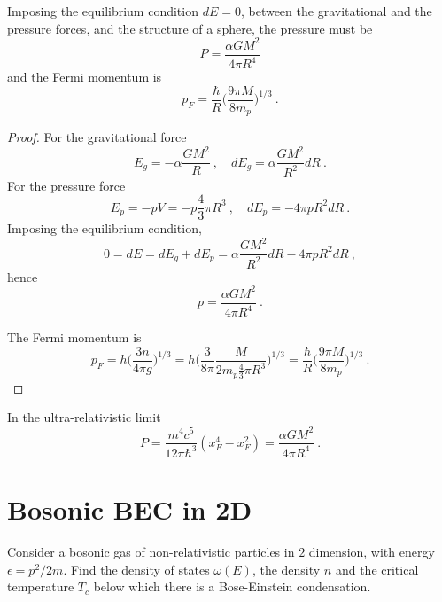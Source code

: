     Imposing the equilibrium condition $dE = 0$, between the gravitational and the pressure forces, and the structure of a sphere, the pressure must be 
    \begin{equation*}
        P = \frac{\alpha G M^2}{4 \pi R^4}
    \end{equation*}
    and the Fermi momentum is 
    \begin{equation*}
        p_F = \frac{\hbar}{R} \Big ( \frac{9 \pi M}{8 m_p} \Big)^{1/3} ~.
    \end{equation*}
    \begin{proof}
        For the gravitational force 
        \begin{equation*}
            E_g = - \alpha \frac{G M^2}{R} ~, \quad dE_g = \alpha \frac{GM^2}{R^2} dR ~.
        \end{equation*}
        For the pressure force 
        \begin{equation*}
            E_p = - p V = - p \frac{4}{3} \pi R^3 ~, \quad dE_p = - 4 \pi p R^2 dR ~.
        \end{equation*}
        Imposing the equilibrium condition, 
        \begin{equation*}
            0 = dE = dE_g + dE_p = \alpha \frac{GM^2}{R^2} dR - 4 \pi p R^2 dR ~,
        \end{equation*}
        hence 
        \begin{equation*}
            p = \frac{\alpha G M^2}{4 \pi R^4} ~.
        \end{equation*}

        The Fermi momentum is 
        \begin{equation*}
            p_F = h \Big ( \frac{3 n}{4 \pi g} \Big)^{1/3} = h \Big ( \frac{3}{8 \pi} \frac{M}{2 m_p \frac{4}{3} \pi R^3} \Big)^{1/3} = \frac{\hbar}{R} \Big ( \frac{9 \pi M}{8 m_p} \Big)^{1/3}  ~.
        \end{equation*}
    \end{proof}

    In the ultra-relativistic limit
    \begin{equation*}
        P = \frac{m^4 c^5}{12 \pi \hbar^3} (x_F^4 - x_F^2) = \frac{\alpha G M^2}{4 \pi R^4} ~.
    \end{equation*}

\section{Bosonic BEC in 2D}

    \begin{exercise}
        Consider a bosonic gas of non-relativistic particles in $2$ dimension, with energy $\epsilon = p^2 / 2m$.
        Find the density of states $\omega(E)$, the density $n$ and the critical temperature $T_c$ below which there is a Bose-Einstein condensation.
    \end{exercise}

